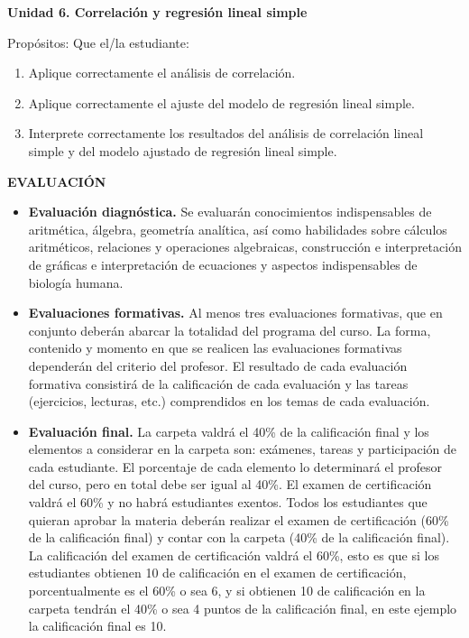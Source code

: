 \textbf{Unidad 6. Correlaci\'on y regresi\'on lineal simple}

Prop\'ositos: Que el/la estudiante:
\begin{enumerate}
    \item Aplique correctamente el an\'alisis de correlaci\'on.
    \item Aplique correctamente el ajuste del modelo de regresi\'on lineal simple.
    \item Interprete correctamente los resultados del an\'alisis de correlaci\'on lineal simple y del modelo ajustado de regresi\'on lineal simple.
\end{enumerate}

\textbf{EVALUACI\'ON}
\begin{itemize}
    \item \textbf{Evaluaci\'on diagn\'ostica.} Se evaluar\'an conocimientos indispensables de aritm\'etica, \'algebra, geometr\'ia anal\'itica, as\'i como habilidades sobre c\'alculos aritm\'eticos, relaciones y operaciones algebraicas, construcci\'on e interpretaci\'on de gr\'aficas e interpretaci\'on de ecuaciones y aspectos indispensables de biolog\'ia humana.
    \item \textbf{Evaluaciones formativas.} Al menos tres evaluaciones formativas, que en conjunto deber\'an abarcar la totalidad del programa del curso. La forma, contenido y momento en que se realicen las evaluaciones formativas depender\'an del criterio del profesor. El resultado de cada evaluaci\'on formativa consistir\'a de la calificaci\'on de cada evaluaci\'on y las tareas (ejercicios, lecturas, etc.) comprendidos en los temas de cada evaluaci\'on.
    \item \textbf{Evaluaci\'on final.} La carpeta valdr\'a el 40\% de la calificaci\'on final y los elementos a considerar en la carpeta son: ex\'amenes, tareas y participaci\'on de cada estudiante. El porcentaje de cada elemento lo determinar\'a el profesor del curso, pero en total debe ser igual al 40\%. El examen de certificaci\'on valdr\'a el 60\% y no habr\'a estudiantes exentos. Todos los estudiantes que quieran aprobar la materia deber\'an realizar el examen de certificaci\'on (60\% de la calificaci\'on final) y contar con la carpeta (40\% de la calificaci\'on final). La calificaci\'on del examen de certificaci\'on valdr\'a el 60\%, esto es que si los estudiantes obtienen 10 de calificaci\'on en el examen de certificaci\'on, porcentualmente es el 60\% o sea 6, y si obtienen 10 de calificaci\'on en la carpeta tendr\'an el 40\% o sea 4 puntos de la calificaci\'on final, en este ejemplo la calificaci\'on final es 10.
\end{itemize}

